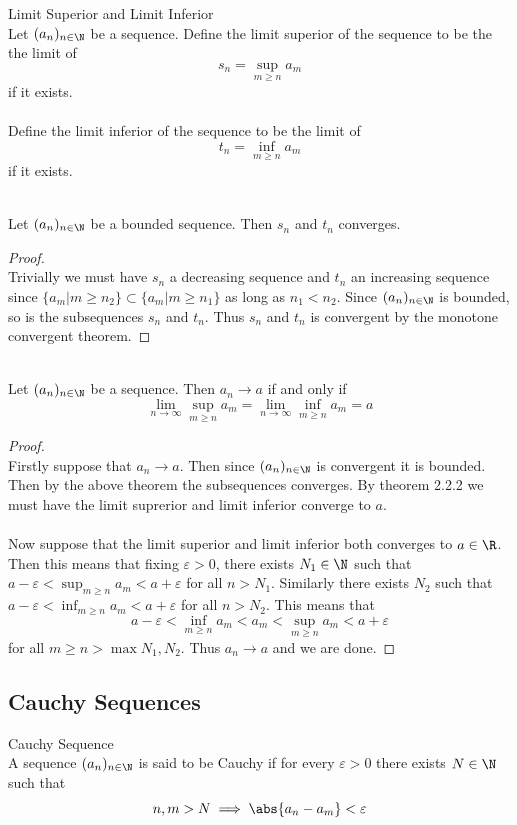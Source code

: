 \documentclass[a4paper]{article}
\begin{document}
\begin{defn}{Limit Superior and Limit Inferior}{}\\ Let $(a_n)_{n\in\N}$ be a sequence. Define the limit superior of the sequence to be the the limit of $$s_n=\sup_{m\geq n}a_m$$ if it exists. \\~\\ Define the limit inferior of the sequence to be the limit of $$t_n=\inf_{m\geq n}a_m$$ if it exists. 
\end{defn}

\begin{prp}{}{}\\ Let $(a_n)_{n\in\N}$ be a bounded sequence. Then $s_n$ and $t_n$ converges. 
\begin{proof}\\
Trivially we must have $s_n$ a decreasing sequence and $t_n$ an increasing sequence since $\{a_m|m\geq n_2\}\subset\{a_m|m\geq n_1\}$ as long as $n_1<n_2$. Since $(a_n)_{n\in\N}$ is bounded, so is the subsequences $s_n$ and $t_n$. Thus $s_n$ and $t_n$ is convergent by the monotone convergent theorem. 
\end{proof}
\end{prp}

\begin{prp}{}{}\\ Let $(a_n)_{n\in\N}$ be a sequence. Then $a_n\to a$ if and only if $$\lim_{n\to\infty}\sup_{m\geq n}a_m=\lim_{n\to\infty}\inf_{m\geq n}a_m=a$$ 
\begin{proof}\\
Firstly suppose that $a_n\to a$. Then since $(a_n)_{n\in\N}$ is convergent it is bounded. Then by the above theorem the subsequences converges. By theorem 2.2.2 we must have the limit suprerior and limit inferior converge to $a$. \\~\\
Now suppose that the limit superior and limit inferior both converges to $a\in\R$. Then this means that fixing $\varepsilon>0$, there exists $N_1\in\N$ such that $a-\varepsilon<\sup_{m\geq n}a_m<a+\varepsilon$ for all $n>N_1$. Similarly there exists $N_2$ such that $a-\varepsilon<\inf_{m\geq n}a_m<a+\varepsilon$ for all $n>N_2$. This means that $$a-\varepsilon<\inf_{m\geq n}a_m<a_m<\sup_{m\geq n}a_m<a+\varepsilon$$ for all $m\geq n>\max{N_1,N_2}$. Thus $a_n\to a$ and we are done. 
\end{proof}
\end{prp}

\subsection{Cauchy Sequences}
\begin{defn}{Cauchy Sequence}{}\\ A sequence $(a_n)_{n\in\N}$ is said to be Cauchy if for every $\varepsilon>0$ there exists $N\in\N$ such that $$n,m>N\implies\abs{a_n-a_m}<\varepsilon$$
\end{defn}
\end{document}

